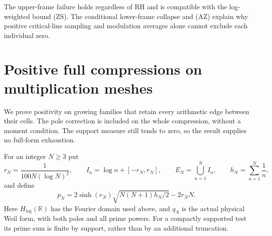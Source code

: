 \documentclass[11pt]{article}
\theoremstyle{remark}\newtheorem{remark}[theorem]{Remark}
\newcommand{\R}{\mathbb R}
\begin{document}
The upper-frame failure holds regardless of RH and is compatible
with the log-weighted bound (ZS). The conditional lower-frame
collapse and (AZ) explain why positive critical-line sampling
and modulation averages alone cannot exclude each individual zero.

\section{Positive full compressions on multiplication meshes}
\label{sec:multiplication-mesh}
We prove positivity on growing families that retain every arithmetic
edge between their cells. The pole correction is included on the
whole compression, without a moment condition. The support measure
still tends to zero, so the result supplies no full-form exhaustion.

For an integer $N\ge3$ put
\[
 r_N=\frac1{100N(\log N)^2},\qquad
 I_n=\log n+[-r_N,r_N],\qquad E_N=\bigcup_{n=1}^N I_n,
 \qquad h_N=\sum_{n=1}^N\frac1n,
\]
and define
\[
 p_N=2\sinh(r_N)\sqrt{N(N+1)h_N/2}-2r_NN. \tag{MM1}
\]
Here $H_{\log}(\R)$ has the Fourier domain used above, and $q_A$
is the actual physical Weil form, with both poles and all prime powers.
For a compactly supported test its prime sum is finite by support,
rather than by an additional truncation.
\end{document}
